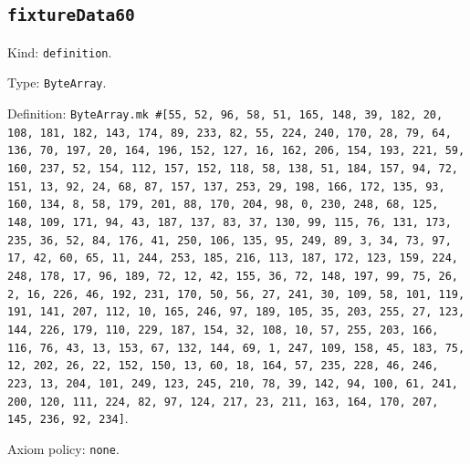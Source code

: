 \documentclass[11pt]{article}
\begin{document}
\subsection*{\texttt{fixtureData60}}
\noindent Kind: \texttt{definition}.\par
\noindent Type: \texttt{ByteArray}.\par
\noindent Definition: \texttt{ByteArray.mk \#[55, 52, 96, 58, 51, 165, 148, 39, 182, 20, 108, 181, 182, 143, 174, 89, 233, 82, 55, 224, 240, 170, 28, 79, 64, 136, 70, 197, 20, 164, 196, 152, 127, 16, 162, 206, 154, 193, 221, 59, 160, 237, 52, 154, 112, 157, 152, 118, 58, 138, 51, 184, 157, 94, 72, 151, 13, 92, 24, 68, 87, 157, 137, 253, 29, 198, 166, 172, 135, 93, 160, 134, 8, 58, 179, 201, 88, 170, 204, 98, 0, 230, 248, 68, 125, 148, 109, 171, 94, 43, 187, 137, 83, 37, 130, 99, 115, 76, 131, 173, 235, 36, 52, 84, 176, 41, 250, 106, 135, 95, 249, 89, 3, 34, 73, 97, 17, 42, 60, 65, 11, 244, 253, 185, 216, 113, 187, 172, 123, 159, 224, 248, 178, 17, 96, 189, 72, 12, 42, 155, 36, 72, 148, 197, 99, 75, 26, 2, 16, 226, 46, 192, 231, 170, 50, 56, 27, 241, 30, 109, 58, 101, 119, 191, 141, 207, 112, 10, 165, 246, 97, 189, 105, 35, 203, 255, 27, 123, 144, 226, 179, 110, 229, 187, 154, 32, 108, 10, 57, 255, 203, 166, 116, 76, 43, 13, 153, 67, 132, 144, 69, 1, 247, 109, 158, 45, 183, 75, 12, 202, 26, 22, 152, 150, 13, 60, 18, 164, 57, 235, 228, 46, 246, 223, 13, 204, 101, 249, 123, 245, 210, 78, 39, 142, 94, 100, 61, 241, 200, 120, 111, 224, 82, 97, 124, 217, 23, 211, 163, 164, 170, 207, 145, 236, 92, 234]}.\par
\noindent Axiom policy: \texttt{none}.\par
\end{document}

